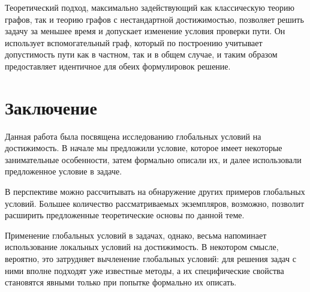 Теоретический подход, максимально задействующий как классическую теорию графов, так и теорию графов с нестандартной достижимостью, позволяет решить задачу за меньшее время и допускает изменение условия проверки пути. Он использует вспомогательный граф, который по построению учитывает допустимость пути как в частном, так и в общем случае, и таким образом предоставляет идентичное для обеих формулировок решение.   

\chapter{Заключение}

Данная работа была посвящена исследованию глобальных условий на достижимость. В начале мы предложили условие, которое имеет некоторые занимательные особенности, затем формально описали их, и далее использовали предложенное условие в задаче.

В перспективе можно рассчитывать на обнаружение других примеров глобальных условий. Большее количество рассматриваемых экземпляров, возможно, позволит расширить предложенные теоретические основы по данной теме. 

Применение глобальных условий в задачах, однако, весьма напоминает использование локальных условий на достижимость. В некотором смысле, вероятно, это затрудняет вычленение глобальных условий: для решения задач с ними вполне подходят уже известные методы, а их специфические свойства становятся явными только при попытке формально их описать.  

\newpage 

